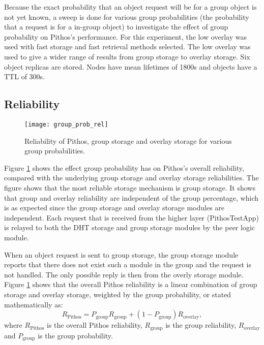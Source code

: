 Because the exact probability that an object request will be for a group object is not yet known, a sweep is done for various group probabilities (the probability that a request is for a in-group object) to investigate the effect of group probability on Pithos's performance. For this experiment, the low overlay was used with fast storage and fast retrieval methods selected. The low overlay was used to give a wider range of results from group storage to overlay storage. Six object replicas are stored. Nodes have mean lifetimes of 1800s and objects have a TTL of 300s.

\subsection{Reliability}

\begin{figure}[htbp]
 \centering
 \texttt{[image: group\_prob\_rel]}
 \caption{Reliability of Pithos, group storage and overlay storage for various group probabilities.}
 \label{fig_group_prob_rel}
\end{figure}
%
Figure \ref{fig_group_prob_rel} shows the effect group probability has on Pithos's overall reliability, compared with the underlying group storage and overlay storage reliabilities. The figure shows that the most reliable storage mechanism is group storage. It shows that group and overlay reliability are independent of the group percentage, which is as expected since the group storage and overlay storage modules are independent. Each request that is received from the higher layer (PithosTestApp) is relayed to both the DHT storage and group storage modules by the peer logic module.

When an object request is sent to group storage, the group storage module reports that there does not exist such a module in the group and the request is not handled. The only possible reply is then from the overly storage module. Figure \ref{fig_group_prob_rel} shows that the overall Pithos reliability is a linear combination of group storage and overlay storage, weighted by the group probability, or stated mathematically as:
%
\begin{equation}
R_{\textrm{Pithos}} = P_{\textrm{group}}R_{\textrm{group}} + (1-P_{\textrm{group}})R_{\textrm{overlay}},
\end{equation}
%
where $R_{\textrm{Pithos}}$ is the overall Pithos reliability, $R_{\textrm{group}}$ is the group reliability, $R_{\textrm{overlay}}$ and $P_{\textrm{group}}$ is the group probability.

